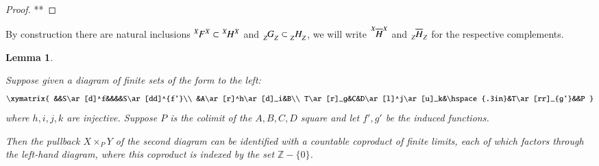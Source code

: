 \documentclass{amsart}
\def\ZZ{{\mathbb Z}}
\def\ol{\overline}
\newcommand{\feeddd}[3]{{\tensor*[^{#2}_{\color{white}{!}}]{{#1}}{^{#3}}}}%
\newcommand{\feedcc}[3]{{\tensor*[^{\color{white}{!}}_{#2}]{{#1}}{_{#3}}}}
\newtheorem{lemma}[subsection]{Lemma}
\theoremstyle{remark}
\theoremstyle{definition}
\begin{document}
\begin{proof}

**

\end{proof}

By construction there are natural inclusions $\feeddd{F}{X}{X}\subset\feeddd{H}{X}{X}$ and $\feedcc{G}{Z}{Z}\subset\feedcc{H}{Z}{Z}$, we will write $\feeddd{\ol{H}}{X}{X}$ and $\feedcc{\ol{H}}{Z}{Z}$ for the respective complements.

\begin{lemma}\label{le:limit-colimit theorem}

Suppose given a diagram of finite sets of the form to the left:
$$\xymatrix{
&&S\ar[d]^f&&&&S\ar[dd]^{f'}\\
&A\ar[r]^h\ar[d]_i&B\\
T\ar[r]_g&C&D\ar[l]^j\ar[u]_k&\hspace{.3in}&T\ar[rr]_{g'}&&P
}
$$
where $h,i,j,k$ are injective. Suppose $P$ is the colimit of the $A,B,C,D$ square and let $f',g'$ be the induced functions.

Then the pullback $X\times_PY$ of the second diagram can be identified with a countable coproduct of finite limits, each of which factors through the left-hand diagram, where this coproduct is indexed by the set $\ZZ-\{0\}$. 

\end{lemma}
\end{document}
